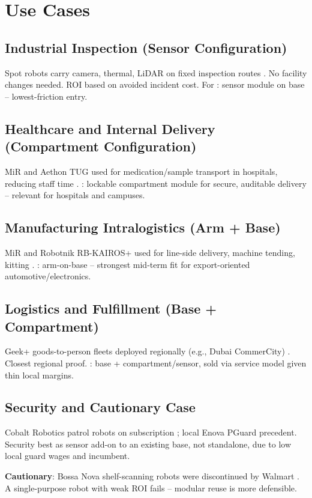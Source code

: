 \chapter{Use Cases}

\section{Industrial Inspection (Sensor Configuration)}

Spot robots carry camera, thermal, LiDAR on fixed inspection routes \cite{standardbots_amr}. No facility changes needed. ROI based on avoided incident cost. For \ProjectName{}: sensor module on base -- lowest-friction entry.

\section{Healthcare and Internal Delivery (Compartment Configuration)}

MiR and Aethon TUG used for medication/sample transport in hospitals, reducing staff time \cite{mir_healthcare,researchgate_hospital}. \ProjectName{}: lockable compartment module for secure, auditable delivery -- relevant for hospitals and campuses.

\section{Manufacturing Intralogistics (Arm + Base)}

MiR and Robotnik RB-KAIROS+ used for line-side delivery, machine tending, kitting \cite{mir250,robotnik_kairos}. \ProjectName{}: arm-on-base -- strongest mid-term fit for export-oriented automotive/electronics.

\section{Logistics and Fulfillment (Base + Compartment)}

Geek+ goods-to-person fleets deployed regionally (e.g., Dubai CommerCity) \cite{fdatabot_amr2026}. Closest regional proof. \ProjectName{}: base + compartment/sensor, sold via service model given thin local margins.

\section{Security and Cautionary Case}

Cobalt Robotics patrol robots on subscription \cite{coherent_security}; local Enova PGuard precedent. Security best as sensor add-on to an existing base, not standalone, due to low local guard wages and incumbent.

\textbf{Cautionary}: Bossa Nova shelf-scanning robots were discontinued by Walmart \cite{dudarenok_retail_china}. A single-purpose robot with weak ROI fails -- modular reuse is more defensible.